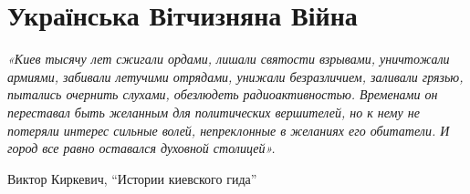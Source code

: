  
 
 
 
 
\chapter{Українська Вітчизняна Війна}

\begin{center}
\Large\em\color{blue}
«Киев тысячу лет сжигали ордами, лишали святости взрывами, уничтожали армиями,
забивали летучими отрядами, унижали безразличием, заливали грязью, пытались
очернить слухами, обезлюдеть радиоактивностью. Временами он переставал быть
желанным для политических вершителей, но к нему не потеряли интерес сильные
волей, непреклонные в желаниях его обитатели. И город все равно оставался
духовной столицей».

Виктор Киркевич, \enquote{Истории киевского гида}
\end{center}














